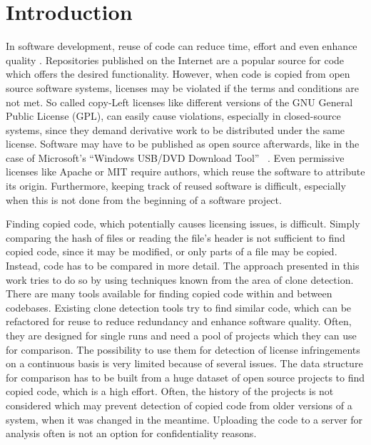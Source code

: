 
\chapter{Introduction}\label{chapter:introduction}
In software development, reuse of code can reduce time, effort and even enhance quality \cite{krueger1992software}.
Repositories published on the Internet are a popular source for code which offers the desired functionality.
However, when code is copied from open source software systems, licenses may be violated if the terms and conditions are not met.
So called copy-Left licenses like different versions of the GNU General Public License (GPL), can easily cause violations, especially in closed-source systems, since they demand derivative work to be distributed under the same license.
Software may have to be published as open source afterwards, like in the case of Microsoft's ``Windows USB/DVD Download Tool'' \ \cite{microsoft2009download}.
Even permissive licenses like Apache or MIT require authors, which reuse the software to attribute its origin.
Furthermore, keeping track of reused software is difficult, especially when this is not done from the beginning of a software project.

Finding copied code, which potentially causes licensing issues, is difficult.
Simply comparing the hash of files or reading the file's header is not sufficient to find copied code, since it may be modified, or only parts of a file may be copied.
Instead, code has to be compared in more detail.
The approach presented in this work tries to do so by using techniques known from the area of clone detection.
There are many tools available for finding copied code within and between codebases.
Existing clone detection tools try to find similar code, which can be refactored for reuse to reduce redundancy and enhance software quality.
Often, they are designed for single runs and need a pool of projects which they can use for comparison.
The possibility to use them for detection of license infringements on a continuous basis is very limited because of several issues.
The data structure for comparison has to be built from a huge dataset of open source projects to find copied code, which is a high effort.
Often, the history of the projects is not considered which may prevent detection of copied code from older versions of a system, when it was changed in the meantime.
Uploading the code to a server for analysis often is not an option for confidentiality reasons.

